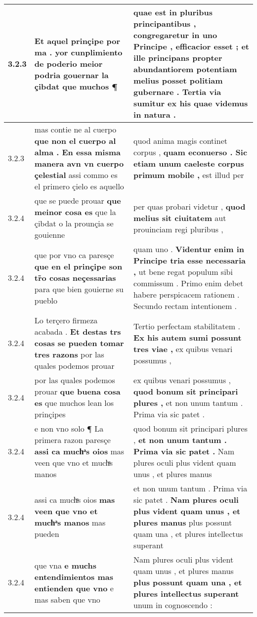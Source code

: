 \begin{tabular}{|p{1cm}|p{6.5cm}|p{6.5cm}|}
3.2.3 & Et aquel prinçipe \textbf{ por ma . yor cunplimiento de poderio meior podria gouernar la çibdat } que muchos ¶ & quae est in pluribus principantibus , congregaretur in uno Principe , efficacior esset ; \textbf{ et ille principans propter abundantiorem potentiam melius posset politiam gubernare . } Tertia via sumitur ex his quae videmus in natura . \\\hline
3.2.3 & mas contie ne al cuerpo \textbf{ que non el cuerpo al alma . En essa misma manera avn vn cuerpo çelestial } assi commo es el primero çielo es aquello & quod anima magis continet corpus , \textbf{ quam econuerso . Sic etiam unum caeleste corpus primum mobile , } est illud per \\\hline
3.2.4 & que se puede prouar \textbf{ que meinor cosa es } que la çibdat o la prounçia se gouienne & per quas probari videtur , \textbf{ quod melius sit ciuitatem } aut prouinciam regi pluribus , \\\hline
3.2.4 & que por vno ca paresçe \textbf{ que en el prinçipe son tr̃o cosas neçessarias } para que bien gouierne su pueblo & quam uno . \textbf{ Videntur enim in Principe tria esse necessaria , } ut bene regat populum sibi commissum . Primo enim debet habere perspicacem rationem . Secundo rectam intentionem . \\\hline
3.2.4 & Lo terçero firmeza acabada . \textbf{ Et destas trs cosas se pueden tomar tres razons } por las quales podemos prouar & Tertio perfectam stabilitatem . \textbf{ Ex his autem sumi possunt tres viae , } ex quibus venari possumus , \\\hline
3.2.4 & por las quales podemos prouar \textbf{ que buena cosa es } que muchos lean los prinçipes & ex quibus venari possumus , \textbf{ quod bonum sit principari plures , } et non unum tantum . Prima via sic patet . \\\hline
3.2.4 & e non vno solo ¶ La primera razon paresçe \textbf{ assi ca muchͣs oios } mas veen que vno et muchͣs manos & quod bonum sit principari plures , \textbf{ et non unum tantum . Prima via sic patet . } Nam plures oculi plus vident quam unus , et plures manus \\\hline
3.2.4 & assi ca muchͣs oios \textbf{ mas veen que vno et muchͣs manos } mas pueden & et non unum tantum . Prima via sic patet . \textbf{ Nam plures oculi plus vident quam unus , et plures manus } plus possunt quam una , et plures intellectus superant \\\hline
3.2.4 & que vna \textbf{ e muchs entendimientos mas entienden que vno } e mas saben que vno & Nam plures oculi plus vident quam unus , et plures manus \textbf{ plus possunt quam una , et plures intellectus superant } unum in cognoscendo : \\\hline

\end{tabular}
